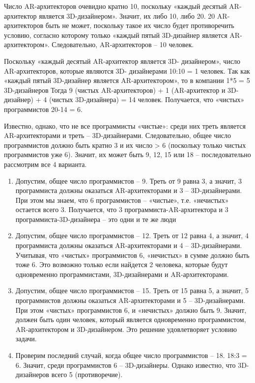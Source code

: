 \solutionSection
Число AR-архитекторов очевидно кратно 10, поскольку «каждый десятый AR-архитектор является 3D-дизайнером». Значит, их либо 10, либо 20. 20 AR-архитекторов быть не может, поскольку такое их число будет противоречить условию, согласно которому только «каждый пятый 3D-дизайнер является AR-архитектором». Следовательно, AR-архитекторов – 10 человек.

Поскольку «каждый десятый AR-архитектор является 3D- дизайнером», число AR-архитекторов, которые являются 3D- дизайнерами 10:10 = 1 человек. Так как «каждый пятый 3D-дизайнер является AR-архитектором», то в компании 1*5 = 5 3D-дизайнеров
Тогда 9 (чистых AR-архитекторов) + 1 (AR-архитектор и 3D-дизайнер) + 4 (чистых 3D-дизайнера) = 14 человек. Получается, что «чистых» программистов 20-14 = 6.

Известно, однако, что не все программисты «чистые»: среди них треть является AR-архитекторами и треть – 3D-дизайнерами. Следовательно, общее число программистов должно быть кратно 3 и их число > 6 (поскольку только чистых программистов уже 6). Значит, их может быть 9, 12, 15 или 18 – последовательно рассмотрим все 4 варианта.
\begin{enumerate}
    \item  Допустим, общее число программистов – 9. Треть от 9 равна 3, а значит, 3 программиста должны оказаться AR-архитекторами и 3 – 3D-дизайнерами. При этом мы знаем, что 6 программистов – «чистые», т.е. «нечистых» остается всего 3. Получается, что 3 программиста-AR-архитектора и 3 программиста-3D-дизайнера – это одни и те же люди
    \item  Допустим, общее число программистов – 12. Треть от 12 равна 4, а значит, 4 программиста должны оказаться AR-архитекторами и 4 – 3D-дизайнерами. Учитывая, что «чистых» программистов 6, «нечистых» в сумме должно быть тоже 6. Это возможно только если найдется 2 человека, которые будут одновременно программистами, 3D-дизайнерами и AR-архитекторами.
    \item  Допустим, общее число программистов – 15. Треть от 15 равна 5, а значит, 5 программистов должны оказаться AR-архитекторами и 5 – 3D-дизайнерами. При этом «чистых» программистов 6, и «нечистых» должно быть 9. Значит, должен быть один человек, который является одновременно программистом, AR-архитектором и 3D-дизайнером.
    Это решение удовлетворяет условию задачи.
    \item   Проверим последний случай, когда общее число программистов – 18. 18:3 = 6. Значит, среди программистов 6 – 3D-дизайнеры. Однако известно, что 3D-дизайнеров всего 5 (противоречие).
\end{enumerate}
